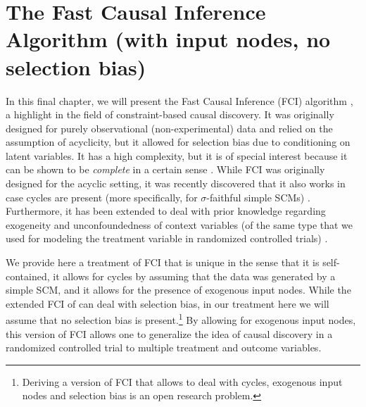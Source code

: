 \section{The Fast Causal Inference Algorithm (with input nodes, no selection bias)}\label{sec:fci}

In this final chapter, we will present the Fast Causal Inference (FCI) algorithm \cite{SMR1995,SMR1999}, a highlight in the field of constraint-based causal discovery.
It was originally designed for purely observational (non-experimental) data and relied on the assumption of acyclicity, but it allowed for selection bias due to conditioning on latent variables.
It has a high complexity, but it is of special interest because it can be shown to be \emph{complete} in a certain sense \cite{Zhang2008_AI}. 
While FCI was originally designed for the acyclic setting, it was recently discovered that it also works in case cycles are present (more specifically, for $\sigma$-faithful simple SCMs) \cite{MooijClaassen_UAI_20}.
Furthermore, it has been extended to deal with prior knowledge regarding exogeneity and unconfoundedness of context variables (of the same type that we used for modeling the treatment variable in randomized controlled trials) \cite{Mooij++_JMLR_20}.

We provide here a treatment of FCI that is unique in the sense that it is self-contained, it allows for cycles by assuming that the data was generated by a simple SCM, and it allows for the presence of exogenous input nodes.
While the extended FCI of \cite{SMR1999} can deal with selection bias, in our treatment here we will assume that no selection bias is present.\footnote{Deriving a version of FCI that allows to deal with cycles, exogenous input nodes and selection bias is an open research problem.}
By allowing for exogenous input nodes, this version of FCI allows one to generalize the idea of causal discovery in a randomized controlled trial to multiple treatment and outcome variables.



